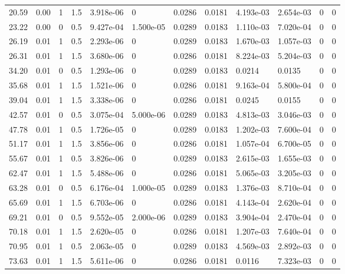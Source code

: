 \documentclass[preview]{standalone}
\begin{document}
{{\begin{tabular}{L{1.2cm}C{1.2cm} C{0.3cm}C{0.5cm} C{1.4cm}C{1.4cm} C{1.4cm}C{1.4cm} C{1.6cm}C{1.6cm} C{1.6cm}C{1.6cm}}
  20.59  &  0.00  & 1     & 1.5 &  3.918e-06  & 0  &  0.0286&   0.0181& 4.193e-03 & 2.654e-03   &  0 & 0  \\ 
  23.22  &  0.00  & 0     & 0.5 &  9.427e-04  & 1.500e-05  &  0.0289&   0.0183& 1.110e-03 & 7.020e-04   &  0 & 0  \\ 
  26.19  &  0.01  & 1     & 0.5 &  2.293e-06  & 0  &  0.0289&   0.0183& 1.670e-03 & 1.057e-03   &  0 & 0  \\ 
  26.31  &  0.01  & 1     & 1.5 &  3.680e-06  & 0  &  0.0286&   0.0181& 8.224e-03 & 5.204e-03   &  0 & 0  \\ 
  34.20  &  0.01  & 0     & 0.5 &  1.293e-06  & 0  &  0.0289&   0.0183& 0.0214 & 0.0135   &  0 & 0  \\ 
  35.68  &  0.01  & 1     & 1.5 &  1.521e-06  & 0  &  0.0286&   0.0181& 9.163e-04 & 5.800e-04   &  0 & 0  \\ 
  39.04  &  0.01  & 1     & 1.5 &  3.338e-06  & 0  &  0.0286&   0.0181& 0.0245 & 0.0155   &  0 & 0  \\ 
  42.57  &  0.01  & 0     & 0.5 &  3.075e-04  & 5.000e-06  &  0.0289&   0.0183& 4.813e-03 & 3.046e-03   &  0 & 0  \\ 
  47.78  &  0.01  & 1     & 0.5 &  1.726e-05  & 0  &  0.0289&   0.0183& 1.202e-03 & 7.600e-04   &  0 & 0  \\ 
  51.17  &  0.01  & 1     & 1.5 &  3.856e-06  & 0  &  0.0286&   0.0181& 1.057e-04 & 6.700e-05   &  0 & 0  \\ 
  55.67  &  0.01  & 1     & 0.5 &  3.826e-06  & 0  &  0.0289&   0.0183& 2.615e-03 & 1.655e-03   &  0 & 0  \\ 
  62.47  &  0.01  & 1     & 1.5 &  5.488e-06  & 0  &  0.0286&   0.0181& 5.065e-03 & 3.205e-03   &  0 & 0  \\ 
  63.28  &  0.01  & 0     & 0.5 &  6.176e-04  & 1.000e-05  &  0.0289&   0.0183& 1.376e-03 & 8.710e-04   &  0 & 0  \\ 
  65.69  &  0.01  & 1     & 1.5 &  6.703e-06  & 0  &  0.0286&   0.0181& 4.143e-04 & 2.620e-04   &  0 & 0  \\ 
  69.21  &  0.01  & 0     & 0.5 &  9.552e-05  & 2.000e-06  &  0.0289&   0.0183& 3.904e-04 & 2.470e-04   &  0 & 0  \\ 
  70.18  &  0.01  & 1     & 1.5 &  2.620e-05  & 0  &  0.0286&   0.0181& 1.207e-03 & 7.640e-04   &  0 & 0  \\ 
  70.95  &  0.01  & 1     & 0.5 &  2.063e-05  & 0  &  0.0289&   0.0183& 4.569e-03 & 2.892e-03   &  0 & 0  \\ 
  73.63  &  0.01  & 1     & 1.5 &  5.611e-06  & 0  &  0.0286&   0.0181& 0.0116 & 7.323e-03   &  0 & 0  \\ 

\end{tabular}}}
\end{document}

